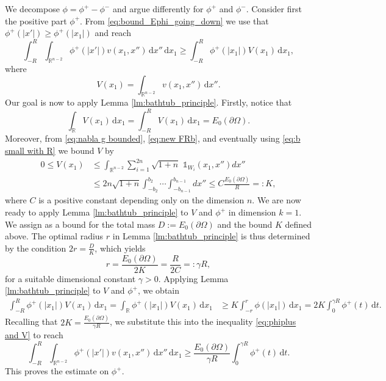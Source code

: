 \documentclass[10pt,leqno]{amsart}
\makeatletter
\newcommand{\R}[0]{\mathbb{R}}
\newcommand{\p}{\partial}
\newcommand{\dd}{\, \mathrm{d}}
\newcommand{\one}{\mathds{1}}
\numberwithin{Theorem}{section}
\theoremstyle{definition}
\theoremstyle{remark}
\numberwithin{equation}{section}
\numberwithin{equation}{section}
\newenvironment{customproof}[1]{%
  \par\pushQED{\qed}%
  \normalfont\topsep6pt \trivlist
  \item[\hskip\labelsep\itshape
    Proof of #1\@addpunct{.}]\ignorespaces
}{%
  \popQED\endtrivlist\@endpefalse
}
\makeatother
\begin{document}
\begin{customproof}{Lemma \ref{lm:bound_on_max_radius_decreasing}}
We decompose $\phi = \phi^+ - \phi^-$ and argue differently for $\phi^+$ and $\phi^-$. Consider first the positive part $\phi^+$. From \eqref{eq:bound_Ephi_going_down} we use that $\phi^+(|x'|)\geq \phi^+(|x_1|) $  and reach
\begin{equation}\label{eq:phiplus and V}
\int_{-R}^{R} \int_{\R^{n-2}} \phi^+(|x'|) v(x_1,x'') \dd x'' \dd x_1 \geq \int_{-R}^{R}  \phi^+(|x_1|) V(x_1) \dd x_1,
\end{equation}
where 
\[
V(x_1)=\int_{\R^{n-2}} v(x_1, x'') \dd x''.
\]
Our goal is now to apply Lemma \ref{lm:bathtub_principle}. Firstly, notice that 
$$
  \int_{\R} V(x_1) \dd x_1=\int_{-R}^{R} V(x_1) \dd x_1 =E_0(\p \Omega).
$$
Moreover, from \eqref{eq:nabla g bounded}, \eqref{eq:new FRb}, and eventually  using \eqref{eq:b small with R} we bound $V$ by
\begin{equation} \label{eq:V_0}
 \begin{split}
    0 \leq V(x_1) &\leq \int_{\R^{n-2}}\sum_{i=1}^{2n}\sqrt{1+n}\,\,\one_{W_i}(x_1,x'')dx''
    \\
    &\leq 2n\sqrt{1+n}\int_{-b_2}^{b_2}\cdots\int_{-b_{n-1}}^{b_{n-1}} dx''
    \leq C\frac{E_0(\p \Omega)}{R}=:K, 
 \end{split}
\end{equation}
where $C$ is a positive constant depending only on the dimension $n$. 
We are now ready to apply Lemma \ref{lm:bathtub_principle} to $V$ and $\phi^+$ in dimension $k=1$. We assign as a bound for the total mass $D := E_0(\p \Omega)$ and the bound $K$ defined above.  The optimal radius $r$ in Lemma \ref{lm:bathtub_principle} is thus determined by the condition $2r = \frac{D}{K}$, which yields
 \[
 r = \frac{E_0(\p \Omega)}{2K} = \frac{R}{2C} =: \gamma R,
 \]
 for a suitable dimensional constant $\gamma > 0$. Applying Lemma \ref{lm:bathtub_principle} to $V$ and $\phi^+$, we obtain
 \begin{align*}
\int_{-R}^{R}\phi^+\left(|x_1|\right) V(x_1) \dd x_1=
\int_{\R}\phi^+\left(|x_1|\right) V(x_1) \dd x_1 
     &\geq K \int_{-r}^{r} \phi(|x_1|) \dd x_1 = 2K \int_0^{\gamma R} \phi^+(t) \dd t.
 \end{align*}
 Recalling that $2K = \frac{E_0(\p \Omega)}{\gamma R}$, we substitute this into the inequality \eqref{eq:phiplus and V} to reach
 \begin{equation}\label{eq:bound_E_phi+}
        \int_{-R}^{R} \int_{\R^{n-2}} \phi^+(|x'|) v(x_1,x'') \dd x'' \dd x_1  \ge \frac{E_0(\p \Omega)}{\gamma R}\int_0^{\gamma R} \phi^+(t) \dd t.
 \end{equation}
 This proves the estimate on $\phi^+$.


\end{customproof}
\end{document}
